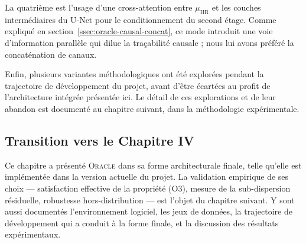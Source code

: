 \documentclass[14pt,a4paper,openany]{extreport}
\theoremstyle{definition}
\newcommand{\Oracle}{\textsc{Oracle}}
\newcommand{\HR}{\ensuremath{\text{HR}}}
\newcommand{\muHR}{\ensuremath{\mu_{\HR}}}
\begin{document}
La quatrième est l'usage d'une cross-attention entre $\muHR$ et les couches intermédiaires du U-Net pour le conditionnement du second étage. Comme expliqué en section~\ref{ssec:oracle-causal-concat}, ce mode introduit une voie d'information parallèle qui dilue la traçabilité causale ; nous lui avons préféré la concaténation de canaux.

Enfin, plusieurs variantes méthodologiques ont été explorées pendant la trajectoire de développement du projet, avant d'être écartées au profit de l'architecture intégrée présentée ici. Le détail de ces explorations et de leur abandon est documenté au chapitre suivant, dans la méthodologie expérimentale.

\subsection{Transition vers le Chapitre IV}
\label{ssec:oracle-transition}

Ce chapitre a présenté \Oracle{} dans sa forme architecturale finale, telle qu'elle est implémentée dans la version actuelle du projet. La validation empirique de ses choix --- satisfaction effective de la propriété (O3), mesure de la sub-dispersion résiduelle, robustesse hors-distribution --- est l'objet du chapitre suivant. Y sont aussi documentés l'environnement logiciel, les jeux de données, la trajectoire de développement qui a conduit à la forme finale, et la discussion des résultats expérimentaux.

\end{document}
